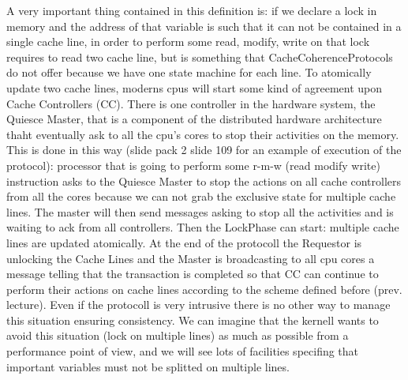 \documentclass[a4paper,12pt]{article}
\begin{document}
A very important thing contained in this definition is: if we declare a lock in memory and the address of that variable is such that it can not be contained in a single cache line, in order to perform some read, modify, write on that lock requires to read two cache line, but is something that CacheCoherenceProtocols do not offer because we have one state machine for each line. To atomically update two cache lines, moderns cpus will start some kind of agreement upon Cache Controllers (CC). There is one controller in the hardware system, the Quiesce Master, that is a component of the distributed hardware architecture thaht eventually ask to all the cpu's cores to stop their activities on the memory. This is done in this way (slide pack 2 slide 109 for an example of execution of the protocol): processor that is going to perform some r-m-w (read modify write) instruction asks to the Quiesce Master to stop the actions on all cache controllers from all the cores because we can not grab the exclusive state for multiple cache lines. The master will then send messages asking to stop all the activities and is waiting to ack from all controllers. Then the LockPhase can start: multiple cache lines are updated atomically. At the end of the protocoll the Requestor is unlocking the Cache Lines and the Master is broadcasting to all cpu cores a message telling that the transaction is completed so that CC can continue to perform their actions on cache lines according to the scheme defined before (prev. lecture).  Even if the protocoll is very intrusive there is no other way to manage this situation ensuring consistency. We can imagine that the kernell wants to avoid this situation (lock on multiple lines) as much as possible from a performance point of view, and we will see lots of facilities specifing that important variables must not be splitted on multiple lines.
\end{document}
